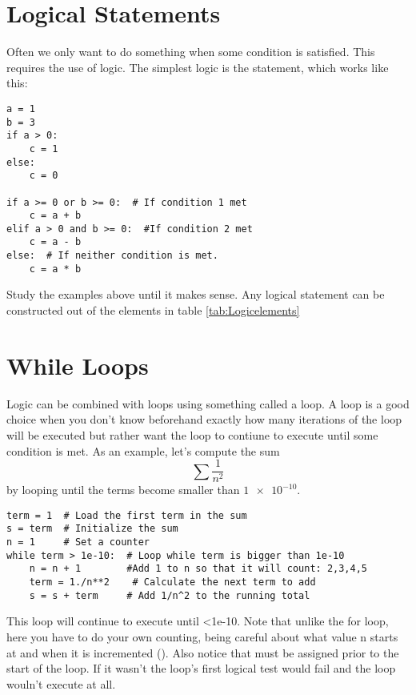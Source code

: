 \section{Logical Statements}
 Often we only want to do something when some condition is satisfied.
This requires the use of logic.  The simplest logic is the 
statement, which works like this:
\begin{Verbatim}
a = 1
b = 3
if a > 0:
    c = 1
else:
    c = 0

if a >= 0 or b >= 0:  # If condition 1 met
    c = a + b
elif a > 0 and b >= 0:  #If condition 2 met
    c = a - b
else:  # If neither condition is met.
    c = a * b
\end{Verbatim}
Study the examples above until it makes sense.  Any logical statement
can be constructed out of the elements in table
\ref{tab:Logicelements}

\section{While Loops}
Logic can be combined with loops using something called a
 loop.  A  loop is a good choice when you
don't know beforehand exactly how many iterations of the loop will be
executed but rather want the loop to contiune to execute until some
condition is met.  As an example, let's compute the sum
\begin{equation}
\sum \frac{1}{n^2}
\end{equation}
by looping until the terms become smaller than $\num{1e-10}$.
\begin{Verbatim}
term = 1  # Load the first term in the sum
s = term  # Initialize the sum
n = 1     # Set a counter
while term > 1e-10:  # Loop while term is bigger than 1e-10
    n = n + 1        #Add 1 to n so that it will count: 2,3,4,5
    term = 1./n**2    # Calculate the next term to add
    s = s + term     # Add 1/n^2 to the running total
\end{Verbatim}
This loop will continue to execute until <1e-10. Note
that unlike the for loop, here you have to do your own counting, being
careful about what value n starts at and when it is incremented
(). Also notice that  must be assigned
prior to the start of the loop.  If it wasn't the loop's first logical
test would fail and the loop wouln't execute at all.

